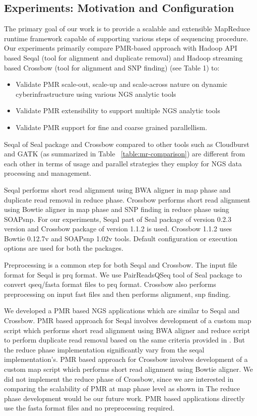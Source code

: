 \documentclass{acm_proc_article-sp}
\begin{document}
\subsection{Experiments: Motivation and Configuration}

The primary goal of our work is to provide a scalable and extensible
MapReduce runtime framework capable of supporting various steps of
sequencing procedure. Our experiments primarily compare PMR-based approach
with Hadoop API based Seqal (tool for alignment and duplicate removal)
and Hadoop streaming based Crossbow (tool for alignment and SNP
finding) (see Table 1) to:
\begin{itemize}
\item{Validate PMR scale-out, scale-up and scale-across nature on dynamic cyberinfrastructure using various NGS analytic tools}
\item{Validate PMR extensibility to support multiple NGS analytic tools}
\item{Validate PMR support for fine and coarse grained parallellism}.
\end{itemize}

Seqal of Seal package and Crossbow compared to other tools such as Cloudburst and GATK (as summarized in Table ~\ref{table:mr-comparison}) are different from each other in terms of usage and parallel strategies they employ for NGS data processing and management.

Seqal performs short read alignment using BWA aligner in map phase and duplicate read removal in reduce phase.  Crossbow performs short read alignment using Bowtie aligner in map phase and SNP finding in reduce phase using SOAPsnp. For our experiments, Seqal part of Seal package of version 0.2.3 version and Crossbow package of version 1.1.2 is used. Crossbow 1.1.2 uses Bowtie 0.12.7v and SOAPsnp 1.02v tools. Default configuration or execution options are used for both the packages.

Preprocessing is a common step for both Seqal and Crossbow. The input file format for Seqal is prq format.  We use PairReadsQSeq tool of Seal package to convert qseq/fasta format files to prq format. Crossbow also performs preprocessing on input fast files and then performs alignment, snp finding. 

We developed a PMR based NGS applications which are similar to Seqal and Crossbow. PMR based approach for Seqal involves development of a custom map script which performs short read alignment using BWA aligner and reduce script to perform duplicate read removal based on the same criteria provided in \cite{seal_2011_mapred}. But the reduce phase implementation significantly vary from the seqal implementation's. PMR based approach for Crossbow involves development of a custom map script which performs short read alignment using Bowtie aligner. We did not implement the reduce phase of Crossbow, since we are interested in comparing the scalability of PMR at map phase level as shown in  The reduce phase development would be our future work. PMR based applications directly use the fasta format files and no preprocessing required.
\end{document}
